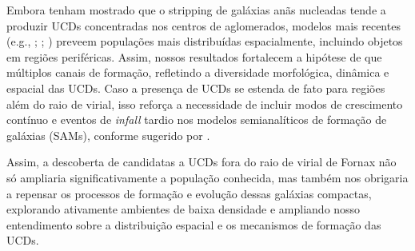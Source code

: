 Embora \citet{Bekki_2001} tenham mostrado que o stripping de galáxias anãs nucleadas tende a produzir UCDs concentradas nos centros de aglomerados, modelos mais recentes (e.g., \citealt{Br_ns_2011}; \citealt{Mieske_2011}; \citealt{Pfeffer_2016}) preveem populações mais distribuídas espacialmente, incluindo objetos em regiões periféricas. Assim, nossos resultados fortalecem a hipótese de que múltiplos canais de formação, refletindo a diversidade morfológica, dinâmica e espacial das UCDs. Caso a presença de UCDs se estenda de fato para regiões além do raio de virial, isso reforça a necessidade de incluir modos de crescimento contínuo e eventos de \textit{infall} tardio nos modelos semianalíticos de formação de galáxias (SAMs), conforme sugerido por \citet{Pfeffer_2016}.

Assim, a descoberta de candidatas a UCDs fora do raio de virial de Fornax não só ampliaria significativamente a população conhecida, mas também nos obrigaria a repensar os processos de formação e evolução dessas galáxias compactas, explorando ativamente ambientes de baixa densidade e ampliando nosso entendimento sobre a distribuição espacial e os mecanismos de formação das UCDs.


